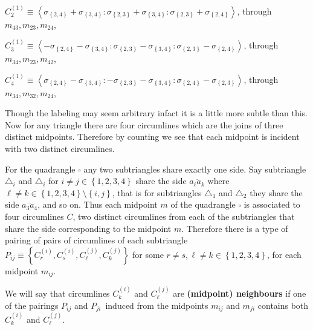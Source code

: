 \documentclass[11pt]{article}
\begin{document}
$C_{2}^{\left( 1\right) }\equiv \left\langle \sigma _{\left\{ 2,4\right\}
}+\sigma _{\left\{ 3,4\right\} }:\sigma _{\left\{ 2,3\right\} }+\sigma
_{\left\{ 3,4\right\} }:\sigma _{\left\{ 2,3\right\} }+\sigma _{\left\{
2,4\right\} }\right\rangle $, through $m_{43},m_{23},m_{24}$,

$C_{3}^{\left( 1\right) }\equiv \left\langle -\sigma _{\left\{ 2,4\right\}
}-\sigma _{\left\{ 3,4\right\} }:\sigma _{\left\{ 2,3\right\} }-\sigma
_{\left\{ 3,4\right\} }:\sigma _{\left\{ 2,3\right\} }-\sigma _{\left\{
2,4\right\} }\right\rangle $, through $m_{34},m_{23},m_{42}$,

$C_{4}^{\left( 1\right) }\equiv \left\langle \sigma _{\left\{ 2,4\right\}
}-\sigma _{\left\{ 3,4\right\} }:-\sigma _{\left\{ 2,3\right\} }-\sigma
_{\left\{ 3,4\right\} }:\sigma _{\left\{ 2,4\right\} }-\sigma _{\left\{
2,3\right\} }\right\rangle $, through $m_{34},m_{32},m_{24}$,

\bigskip 

Though the labeling may seem arbitrary infact it is a little more subtle
than this. Now for any triangle there are four circumlines which are the
joins of three distinct midpoints. Therefore by counting we see that each
midpoint is incident with two distinct circumlines. 

For the quadrangle $\square $ any two subtriangles share exactly one side.
Say subtriangle $\triangle _{i}$ and $\triangle _{i}$ for $i\neq j\in
\left\{ 1,2,3,4\right\} $ share the side $\overline{a_{\ell }a_{k}}$ where $%
\ell \neq k\in \left\{ 1,2,3,4\right\} \setminus \left\{ i,j\right\} $, that
is for subtriangles $\triangle _{1}$ and $\triangle _{2}$ they share the
side $\overline{a_{3}a_{4}}$, and so on. Thus each midpoint $m$ of the
quadrangle $\square $ is associated to four circumlines $C$, two distinct
circumlines from each of the subtriangles that share the side corresponding
to the midpoint $m$. Therefore there is a type of pairing of pairs of
circumlines of each subtriangle $P_{ij}\equiv \left\{ C_{r}^{\left( i\right)
},C_{s}^{\left( i\right) },C_{\ell }^{\left( j\right) },C_{k}^{\left(
j\right) }\right\} $ for some $r\neq s,\ell \neq k\in \left\{
1,2,3,4\right\} $, for each midpoint $m_{ij}$.

We will say that circumlines $C_{k}^{\left( i\right) }$ and $C_{\ell
}^{\left( j\right) }$ are \textbf{(midpoint) neighbours} if one of the
pairings $P_{ij}$ and $P_{ji}$\ induced from the midpoints $m_{ij}$ and $%
m_{ji}$ contains both $C_{k}^{\left( i\right) }$ and $C_{\ell }^{\left(
j\right) }$.
\end{document}
